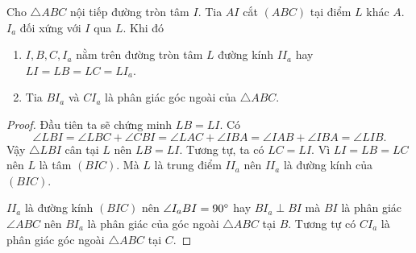 \begin{lemma}
Cho $\triangle ABC$ nội tiếp đường tròn tâm $I$. Tia $AI$ cắt $(ABC)$ tại điểm $L$ khác $A$. $I_a$ đối xứng với $I$ qua $L$. Khi đó
\begin{enumerate}
\item $I, B, C, I_a$ nằm trên đường tròn tâm $L$ đường kính $I I_a$ hay $LI = LB = LC = L I_a$.
\item Tia $B I_a$ và $C I_a$ là phân giác góc ngoài của $\triangle ABC$.
\end{enumerate}

\begin{center}

\end{center}

\end{lemma}

\begin{proof}

Đầu tiên ta sẽ chứng minh $LB = LI$. Có 
$$
\angle LBI = \angle LBC + \angle CBI = \angle LAC + \angle IBA = \angle IAB + \angle IBA = \angle LIB.
$$
Vậy $\triangle LBI$ cân tại $L$ nên $LB = LI$. Tương tự, ta có $LC = LI$. Vì $LI = LB = LC$ nên $L$ là tâm $(BIC)$. Mà $L$ là trung điểm $I I_a$ nên $I I_a$ là đường kính của $(BIC)$.

$I I_a$ là đường kính $(BIC)$ nên $\angle I_a BI = 90 \degree$ hay $B I_a \perp BI$ mà $BI$ là phân giác $\angle ABC$ nên $B I_a$ là phân giác của góc ngoài $\triangle ABC$ tại $B$. Tương tự có $C I_a$ là phân giác góc ngoài $\triangle ABC$ tại $C$.

\end{proof}